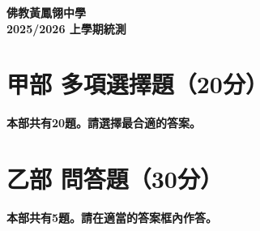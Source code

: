 \documentclass[12pt,a4paper]{article}
\newcommand{\answerline}[1]{\par\vspace{0.5em}\noindent\rule{\linewidth}{0.4pt}\vspace{0.5em}}
\newenvironment{myquestionbox}[1]{%
    \par\vspace{1em}\hrule\vspace{1em}
    \textbf{答案框（共#1分）}\par
    \vspace{1em}\hrule\vspace{1em}
}{%
    \par\vspace{1em}\hrule\vspace{1em}
}
\begin{document}
\begin{center}
{\Large\bfseries 佛教黃鳳翎中學}\\[0.5em]
{\Large\bfseries 2025/2026 上學期統測}\\[1em]
\end{center}

\newpage

\section{\textbf{甲部 多項選擇題（20分）}}
\textbf{本部共有20題。請選擇最合適的答案。}

\begin{enumerate}
\questionsplacehodler
\end{enumerate}

\newpage

\section{\textbf{乙部 問答題（30分）}}
\textbf{本部共有5題。請在適當的答案框內作答。}
\begin{enumerate}
\qaquestionsplacehodler
\end{enumerate}
\newpage

\end{document}
